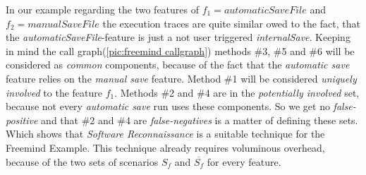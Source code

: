 \emptyLine
In our example regarding the two features of $f_1 = automaticSaveFile$ and $f_2 = manualSaveFile$ the execution traces are quite similar owed to the fact, that the \textit{automaticSaveFile}-feature is just a not user triggered \textit{internalSave}. Keeping in mind the call graph(\autoref{pic:freemind callgraph}) methods \#3, \#5 and \#6 will be considered as \textit{common} components, because of the fact that the \textit{automatic save} feature relies on the \textit{manual save} feature. Method \#1 will be considered \textit{uniquely involved} to the feature $f_1$. Methods \#2 and \#4 are in the \textit{potentially involved} set, because not every \textit{automatic save} run uses these components. So we get no \textit{false-positive} and that \#2 and \#4 are \textit{false-negatives} is a matter of defining these sets. Which shows that \textit{Software Reconnaissance} is a suitable technique for the Freemind Example.\newline
\emptyLine
This technique already requires voluminous overhead, because of the two sets of scenarios $S_f$ and $\overline{S_f}$ for every feature.


